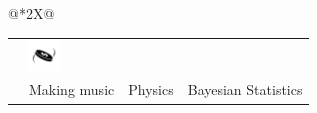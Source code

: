 \documentclass{resume}
\begin{document}
\begin{center}
\begin{tabularx}{\linewidth}{@{}*{2}{X}@{}}
{{\begin{tabularx}{\linewidth}{@{}*{4}{>{\centering\arraybackslash}X}@{}}
{            } &
            {\centering
            \includegraphics[width=0.8cm]{images/probability.png}
            } \\
            {\footnotesize Animation} & {\footnotesize Making music} & {\footnotesize Physics} & {\footnotesize Bayesian Statistics}
        \end{tabularx}
    }
}
\end{tabularx}
\end{center}
\end{document}
